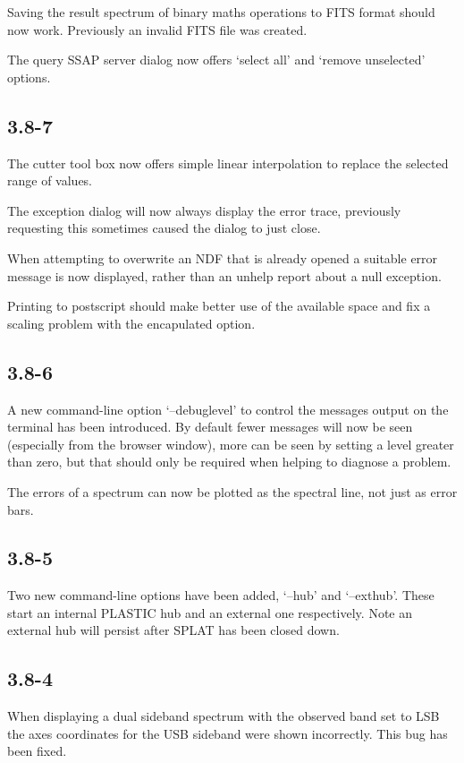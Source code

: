 \documentclass[twoside,11pt]{article}
\renewcommand{\_}{\texttt{\symbol{95}}}
\begin{document}
Saving the result spectrum of binary maths operations to FITS format
should now work. Previously an invalid FITS file was created.

The query SSAP server dialog now offers `select all' and `remove
unselected' options.

\subsection{3.8-7}
The cutter tool box now offers simple linear interpolation to replace
the selected range of values.

The exception dialog will now always display the error trace, previously
requesting this sometimes caused the dialog to just close.

When attempting to overwrite an NDF that is already opened a suitable
error message is now displayed, rather than an unhelp report about
a null exception.

Printing to postscript should make better use of the available space
and fix a scaling problem with the encapulated option.

\subsection{3.8-6}

A new command-line option `--debuglevel' to control the messages output on the
terminal has been introduced. By default fewer messages will now be seen
(especially from the browser window), more can be seen by setting a level
greater than zero, but that should only be required when helping to diagnose a
problem.

The errors of a spectrum can now be plotted as the spectral line, not just as
error bars.

\subsection{3.8-5}

Two new command-line options have been added, `--hub' and `--exthub'.
These start an internal PLASTIC hub and an external one respectively.
Note an external hub will persist after SPLAT has been closed down.

\subsection{3.8-4}

When displaying a dual sideband spectrum with the observed band set to LSB the
axes coordinates for the USB sideband were shown incorrectly. This bug has
been fixed.
\end{document}
